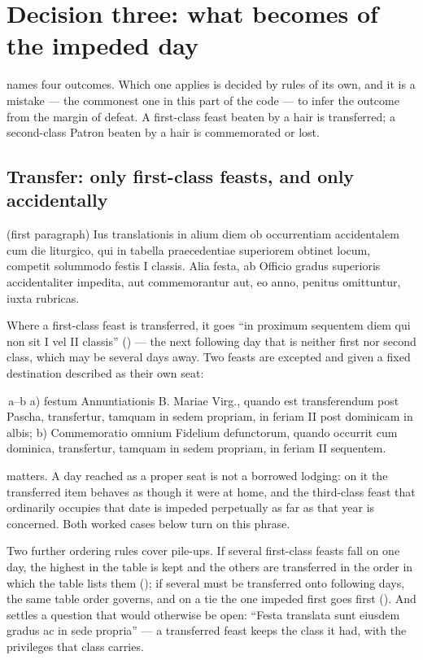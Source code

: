 \section{Decision three: what becomes of the impeded day}

 names four outcomes. Which one applies is decided by rules of its own,
and it is a mistake --- the commonest one in this part of the code --- to infer
the outcome from the margin of defeat. A first-class feast beaten by a hair is
transferred; a second-class Patron beaten by a hair is commemorated or lost.

\subsection{Transfer: only first-class feasts, and only accidentally}

\begin{rulebox}{ (first paragraph)}
Ius translationis in alium diem ob occurrentiam accidentalem cum die
liturgico, qui in tabella praecedentiae superiorem obtinet locum, competit
solummodo festis I classis. Alia festa, ab Officio gradus superioris
accidentaliter impedita, aut commemorantur aut, eo anno, penitus omittuntur,
iuxta rubricas.
\end{rulebox}

Where a first-class feast is transferred, it goes ``in proximum sequentem diem
qui non sit I vel II classis'' () --- the next following day that is
neither first nor second class, which may be several days away. Two feasts are
excepted and given a fixed destination described as their own seat:

\begin{rulebox}{\,a--b}
a) festum Annuntiationis B. Mariae Virg., quando est transferendum post
Pascha, transfertur, tamquam in sedem propriam, in feriam II post dominicam in
albis; b) Commemoratio omnium Fidelium defunctorum, quando occurrit cum
dominica, transfertur, tamquam in sedem propriam, in feriam II sequentem.
\end{rulebox}

\noindent
{} matters. A day reached as a proper seat is
not a borrowed lodging: on it the transferred item behaves as though it were at
home, and the third-class feast that ordinarily occupies that date is impeded
perpetually as far as that year is concerned. Both worked cases below turn on
this phrase.

Two further ordering rules cover pile-ups. If several first-class feasts fall
on one day, the highest in the table is kept and the others are transferred in
the order in which the table lists them (); if several must be
transferred onto following days, the same table order governs, and on a tie the
one impeded first goes first (). And  settles a question that
would otherwise be open: ``Festa translata sunt eiusdem gradus ac in sede
propria'' --- a transferred feast keeps the class it had, with the privileges
that class carries.

